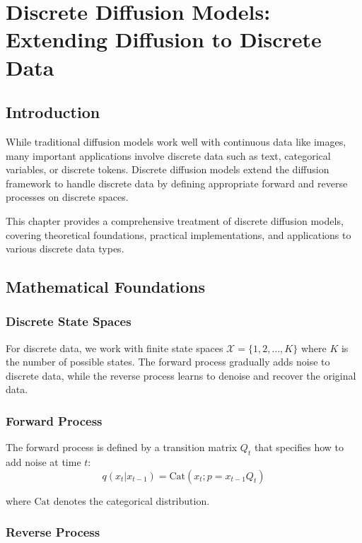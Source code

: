 \chapter{Discrete Diffusion Models: Extending Diffusion to Discrete Data}

\section{Introduction}

While traditional diffusion models work well with continuous data like images, many important applications involve discrete data such as text, categorical variables, or discrete tokens. Discrete diffusion models extend the diffusion framework to handle discrete data by defining appropriate forward and reverse processes on discrete spaces.

This chapter provides a comprehensive treatment of discrete diffusion models, covering theoretical foundations, practical implementations, and applications to various discrete data types.

\section{Mathematical Foundations}

\subsection{Discrete State Spaces}

For discrete data, we work with finite state spaces $\mathcal{X} = \{1, 2, \ldots, K\}$ where $K$ is the number of possible states. The forward process gradually adds noise to discrete data, while the reverse process learns to denoise and recover the original data.

\subsection{Forward Process}

The forward process is defined by a transition matrix $Q_t$ that specifies how to add noise at time $t$:
\begin{equation}
    q(x_t | x_{t-1}) = \text{Cat}(x_t; p = x_{t-1} Q_t)
\end{equation}

where $\text{Cat}$ denotes the categorical distribution.

\subsection{Reverse Process}

